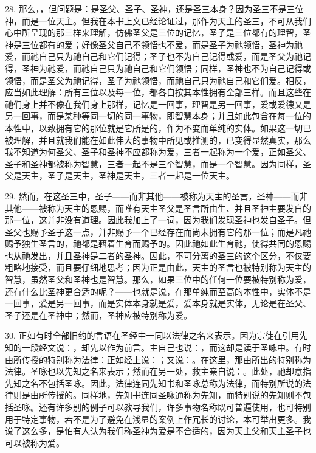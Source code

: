 28. 那么，，但问题是：是圣父、圣子、圣神，还是圣三本身？因为圣三不是三位神，而是一位天主。但我在本书上文已经论证过，那作为天主的圣三，不可从我们心中所呈现的那三样来理解，仿佛圣父是三位的记忆，圣子是三位都有的理智，圣神是三位都有的爱；好像圣父自己不领悟也不爱，而是圣子为祂领悟，圣神为祂爱，而祂自己只为祂自己和它们记得；圣子也不为自己记得或爱，而是圣父为祂记得，圣神为祂爱，而祂自己只为祂自己和它们领悟；同样，圣神也不为自己记得或领悟，而是圣父为祂记得，圣子为祂领悟，而祂自己只为祂自己和它们爱。相反，应当如此理解：所有三位以及每一位，都各自按其本性拥有全部三样。而且这些在祂们身上并不像在我们身上那样，记忆是一回事，理智是另一回事，爱或爱德又是另一回事，而是某种等同一切的同一事物，即智慧本身；并且如此包含在每一位的本性中，以致拥有它的那位就是它所是的，作为不变而单纯的实体。如果这一切已被理解，并且就我们能在如此伟大的事物中所见或推测的，已变得显然真实，那么我不知道为何圣父、圣子和圣神不应都称为爱，三者一起称为一个爱，正如圣父、圣子和圣神都被称为智慧，三者一起不是三个智慧，而是一个智慧。因为同样，圣父是天主，圣子是天主，圣神是天主，三者一起是一位天主。\par

29. 然而，在这圣三中，圣子——而非其他——被称为天主的圣言，圣神——而非其他——被称为天主的恩赐，而唯有天主圣父是圣言所由生、并且圣神主要发自的那一位，这并非没有道理。因此我加上了一词，因为我们发现圣神也发自圣子。但圣父也赐予圣子这一点，并非赐予一个已经存在而尚未拥有它的那一位；而是凡祂赐予独生圣言的，祂都是藉着生育而赐予的。因此祂如此生育祂，使得共同的恩赐也从祂发出，并且圣神是二者的圣神。因此，不可分离的圣三的这个区分，不仅要粗略地接受，而且要仔细地思考；因为正是由此，天主的圣言也被特别称为天主的智慧，虽然圣父和圣神也是智慧。那么，如果三位中的任何一位要被特别称为爱，还有什么比圣神更合适的呢？——也就是说，在那单纯而至高的本性中，实体不是一回事，爱是另一回事，而是实体本身就是爱，爱本身就是实体，无论是在圣父、圣子还是在圣神中；然而，圣神应被特别称为爱。\par

30. 正如有时全部旧约的言语在圣经中一同以法律之名来表示。因为宗徒在引用先知的一段经文说：，却先以作为前言。主自己也说：，而这却是读于圣咏中。有时由所传授的特别称为法律：正如经上说：；又说：。在这里，那由所出的特别称为法律。圣咏也以先知之名来表示；然而在另一处，救主亲自说：。此处，祂却意指先知之名不包括圣咏。因此，法律连同先知书和圣咏总称为法律，而特别所说的法律则是由所传授的。同样地，先知书连同圣咏通称为先知，而特别说的先知则不包括圣咏。还有许多别的例子可以教导我们，许多事物名称既可普遍使用，也可特别用于特定事物，若不是为了避免在浅显的案例上作冗长的讨论，本可举出更多。我说了这么多，是怕有人认为我们称圣神为爱是不合适的，因为天主父和天主圣子也可以被称为爱。\par

